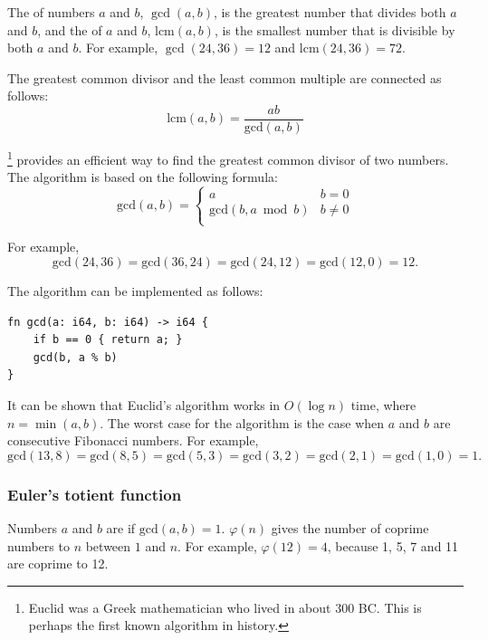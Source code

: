 
The  of
numbers $a$ and $b$, $\gcd(a,b)$,
is the greatest number that divides both $a$ and $b$,
and the  of
$a$ and $b$, $\textrm{lcm}(a,b)$,
is the smallest number that is divisible by
both $a$ and $b$.
For example,
$\gcd(24,36)=12$ and
$\textrm{lcm}(24,36)=72$.

The greatest common divisor and the least common multiple
are connected as follows:
\[\textrm{lcm}(a,b)=\frac{ab}{\textrm{gcd}(a,b)}\]

\footnote{Euclid was a Greek mathematician who
lived in about 300 BC. This is perhaps the first known algorithm in history.} provides an efficient way
to find the greatest common divisor of two numbers.
The algorithm is based on the following formula:
\begin{equation*}
    \textrm{gcd}(a,b) = \begin{cases}
               a        & b = 0\\
               \textrm{gcd}(b,a \bmod b) & b \neq 0\\
           \end{cases}
\end{equation*}

For example,
\[\textrm{gcd}(24,36) = \textrm{gcd}(36,24)
= \textrm{gcd}(24,12) = \textrm{gcd}(12,0)=12.\]

The algorithm can be implemented as follows:
\begin{lstlisting}
fn gcd(a: i64, b: i64) -> i64 {
    if b == 0 { return a; }
    gcd(b, a % b)
}
\end{lstlisting}

It can be shown that Euclid's algorithm works
in $O(\log n)$ time, where $n=\min(a,b)$.
The worst case for the algorithm is
the case when $a$ and $b$ are consecutive Fibonacci numbers.
For example,
\[\textrm{gcd}(13,8)=\textrm{gcd}(8,5)
=\textrm{gcd}(5,3)=\textrm{gcd}(3,2)=\textrm{gcd}(2,1)=\textrm{gcd}(1,0)=1.\]

\subsubsection{Euler's totient function}


Numbers $a$ and $b$ are 
if $\textrm{gcd}(a,b)=1$.
 $\varphi(n)$
gives the number of coprime numbers to $n$
between $1$ and $n$.
For example, $\varphi(12)=4$,
because 1, 5, 7 and 11
are coprime to 12.

